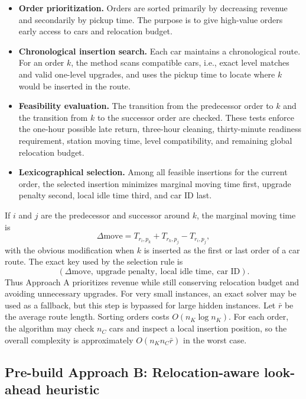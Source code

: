 \documentclass[10pt,a4paper]{article}
\begin{document}
\begin{itemize}
    \item \textbf{Order prioritization.} Orders are sorted primarily by
    decreasing revenue and secondarily by pickup time.  The purpose is to give
    high-value orders early access to cars and relocation budget.
    \item \textbf{Chronological insertion search.} Each car maintains a
    chronological route.  For an order $k$, the method scans compatible cars,
    i.e., exact level matches and valid one-level upgrades, and uses the pickup
    time to locate where $k$ would be inserted in the route.
    \item \textbf{Feasibility evaluation.} The transition from the predecessor
    order to $k$ and the transition from $k$ to the successor order are checked.
    These tests enforce the one-hour possible late return, three-hour cleaning,
    thirty-minute readiness requirement, station moving time, level
    compatibility, and remaining global relocation budget.
    \item \textbf{Lexicographical selection.} Among all feasible insertions for
    the current order, the selected insertion minimizes marginal moving time
    first, upgrade penalty second, local idle time third, and car ID last.
\end{itemize}

If $i$ and $j$ are the predecessor and successor around $k$, the marginal moving
time is
\[
\Delta\text{move}=T_{r_i,p_k}+T_{r_k,p_j}-T_{r_i,p_j},
\]
with the obvious modification when $k$ is inserted as the first or last order of
a car route.
The exact key used by the selection rule is
\[
(\Delta\text{move},\ \text{upgrade penalty},\ \text{local idle time},\ \text{car ID}).
\]
Thus Approach A prioritizes revenue while still conserving relocation budget and
avoiding unnecessary upgrades.  For very small instances, an exact solver may be
used as a fallback, but this step is bypassed for large hidden instances.  Let
$\bar r$ be the average route length.  Sorting orders costs $O(n_K\log n_K)$.
For each order, the algorithm may check $n_C$ cars and inspect a local insertion
position, so the overall complexity is approximately $O(n_K n_C \bar r)$ in the
worst case.

\subsection*{Pre-build Approach B: Relocation-aware look-ahead heuristic}
\end{document}
